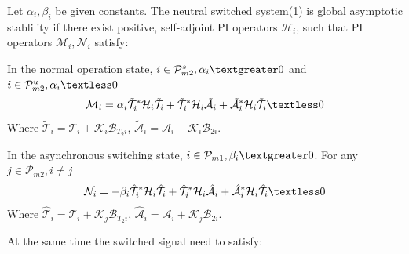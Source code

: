 \documentclass[twocolumn]{autart}    %
\begin{document}
\begin{thm}

Let $\alpha_{i},\beta_{i}$ be given constants. The neutral switched system(1) is global asymptotic stablility if there exist positive, self-adjoint PI operators $\mathcal{H}_{i}$, such that PI operators $\mathcal{M}_{i},\mathcal{N}_{i}$ satisfy:

In the normal operation state, $i \in \mathcal{P}_{m2}^{s},\alpha_{i} \textgreater 0$ and $i \in \mathcal{P}_{m2}^{u},\alpha_{i} \textless 0$
\begin{equation}
        \begin{aligned}
            \setlength{\arraycolsep}{0.9pt}
            \mathcal{M}_{i}  = \alpha_{i}\tilde{\mathcal{T}}_{i}^{*}\mathcal{H}_{i}\tilde{\mathcal{T}}_{i}+\tilde{\mathcal{T}}_{i}^{*}\mathcal{H}_{i}\tilde{\mathcal{A}}_{i}+\tilde{\mathcal{A}}_{i}^{*}\mathcal{H}_{i}\tilde{\mathcal{T}}_{i} \textless 0
        \end{aligned}
    \end{equation}
    Where $\tilde{\mathcal{T}}_{i} = \mathcal{T}_{i}+\mathcal{K}_{i}\mathcal{B}_{T_{2}i}$, $\tilde{\mathcal{A}}_{i} = \mathcal{A}_{i}+\mathcal{K}_{i}\mathcal{B}_{2i}$. 
    
In the asynchronous switching state,  $i \in \mathcal{P}_{m1},\beta_{i} \textgreater 0$. For any $j\in\mathcal{P}_{m2},i \ne j$
    \begin{equation}
        \begin{aligned}
            \setlength{\arraycolsep}{0.9pt}
\mathcal{N}_{i} = -\beta_{i}\hat{\mathcal{T}}_{i}^{*}\mathcal{H}_{i}\hat{\mathcal{T}}_{i}+\hat{\mathcal{T}}_{i}^{*}\mathcal{H}_{i}\hat{\mathcal{A}}_{i}+\hat{\mathcal{A}}_{i}^{*}\mathcal{H}_{i}\hat{\mathcal{T}}_{i} \textless 0
        \end{aligned}
    \end{equation}
    Where $\hat{\mathcal{T}}_{i} = \mathcal{T}_{i}+\mathcal{K}_{j}\mathcal{B}_{T_{2}i}$, $\hat{\mathcal{A}}_{i} = \mathcal{A}_{i}+\mathcal{K}_{j}\mathcal{B}_{2i}$.

    At the same time the switched signal need to satisfy: 


\end{thm}
\end{document}
